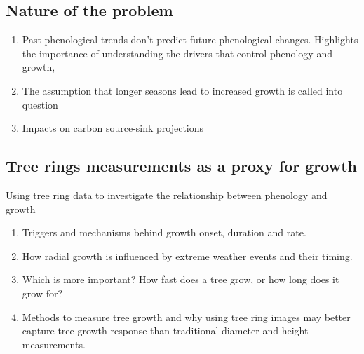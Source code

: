 \documentclass{article}
\begin{document}
\subsection{Nature of the problem} 
\begin{enumerate}
	\item Past phenological trends don't predict future phenological changes. Highlights the importance of understanding the drivers that control phenology and growth,
	\item The assumption that longer seasons lead to increased growth is called into question
	\item Impacts on carbon source-sink projections
\end{enumerate}

\subsection{Tree rings measurements as a proxy for growth}
Using tree ring data to investigate the relationship between phenology and growth

\begin{enumerate}
	\item Triggers and mechanisms behind growth onset, duration and rate.
	\item How radial growth is influenced by extreme weather events and their timing. 
	\item Which is more important? How fast does a tree grow, or how long does it grow for?
	\item Methods to measure tree growth and why using tree ring images may better capture tree growth response than traditional diameter and height measurements.
\end{enumerate}
\end{document}
